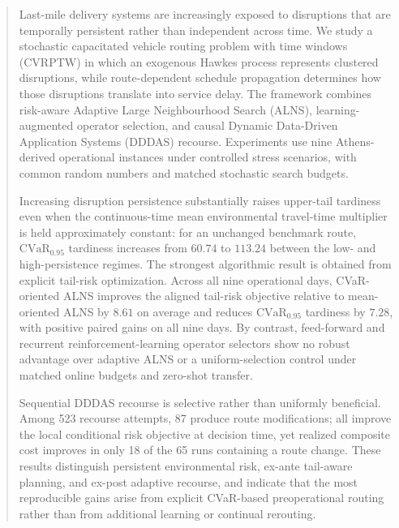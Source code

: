 \documentclass[preprint,12pt]{elsarticle}
\newcommand{\CVaR}{\mathrm{CVaR}}
\newcommand{\1}{\mathbf{1}}
\begin{document}
\begin{frontmatter}
\begin{abstract}
	
	Last-mile delivery systems are increasingly exposed to disruptions that are
	temporally persistent rather than independent across time. We study a stochastic
	capacitated vehicle routing problem with time windows (CVRPTW) in which an
	exogenous Hawkes process represents clustered disruptions, while route-dependent
	schedule propagation determines how those disruptions translate into service
	delay. The framework combines risk-aware Adaptive Large Neighbourhood Search
	(ALNS), learning-augmented operator selection, and causal Dynamic Data-Driven
	Application Systems (DDDAS) recourse. Experiments use nine Athens-derived
	operational instances under controlled stress scenarios, with common random
	numbers and matched stochastic search budgets.
	
	Increasing disruption persistence substantially raises upper-tail tardiness
	even when the continuous-time mean environmental travel-time multiplier is held
	approximately constant: for an unchanged benchmark route,
	$\CVaR_{0.95}$ tardiness increases from $60.74$ to $113.24$ between the
	low- and high-persistence regimes. The strongest algorithmic result is obtained
	from explicit tail-risk optimization. Across all nine operational days,
	CVaR-oriented ALNS improves the aligned tail-risk objective relative to
	mean-oriented ALNS by $8.61$ on average and reduces
	$\CVaR_{0.95}$ tardiness by $7.28$, with positive paired gains on all nine
	days. By contrast, feed-forward and recurrent reinforcement-learning operator
	selectors show no robust advantage over adaptive ALNS or a uniform-selection
	control under matched online budgets and zero-shot transfer.
	
	Sequential DDDAS recourse is selective rather than uniformly beneficial.
	Among 523 recourse attempts, 87 produce route modifications; all improve the
	local conditional risk objective at decision time, yet realized composite cost
	improves in only 18 of the 65 runs containing a route change. These results
	distinguish persistent environmental risk, ex-ante tail-aware planning, and
	ex-post adaptive recourse, and indicate that the most reproducible gains arise
	from explicit CVaR-based preoperational routing rather than from additional
	learning or continual rerouting.
	
\end{abstract}


















\end{frontmatter}
\end{document}
